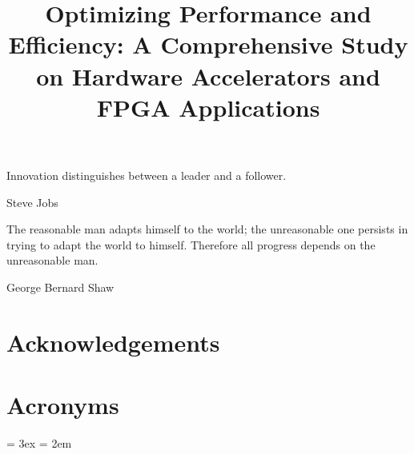 \documentclass[a4paper]{memoir}
\title{Optimizing Performance and Efficiency: A Comprehensive Study on Hardware Accelerators and FPGA Applications}
\begin{document}
\makeatletter
\makeatother
\frontmatter
\titlethesis

\cleardoublepage
\thispagestyle{plain}
\vspace*{.35\textheight}
\setlength{\epigraphwidth}{0.5\textwidth}
\epigraph{Innovation distinguishes between a leader and a follower.}{Steve Jobs}

\cleardoublepage
\thispagestyle{plain}
\vspace*{.35\textheight}
\setlength{\epigraphwidth}{0.48\textwidth}
\epigraph{The reasonable man adapts himself to the world; the unreasonable one persists in trying to adapt the world to himself. Therefore all progress depends on the unreasonable man.}{George Bernard Shaw}

\cleardoublepage
{}
{}
\chapter*{Acknowledgements}


\cleardoublepage
{}
{}

\cleardoublepage
{}
\setcounter{tocdepth}{3}
\tableofcontents*
\cleardoublepage
\let\LaTeXStandardClearpage\clearpage
{}
\listoffigures
\cleardoublepage
{}
\listoftables
\cleardoublepage
{}
\let\clearpage\LaTeXStandardClearpage %
\mainmatter



%
%
%

\chapter*[Acronyms]{Acronyms}


\bibitemsep = 3ex
\bibhang = 2em

\printbibliography[title=\bibname]
\cleardoublepage
{}
\end{document}
